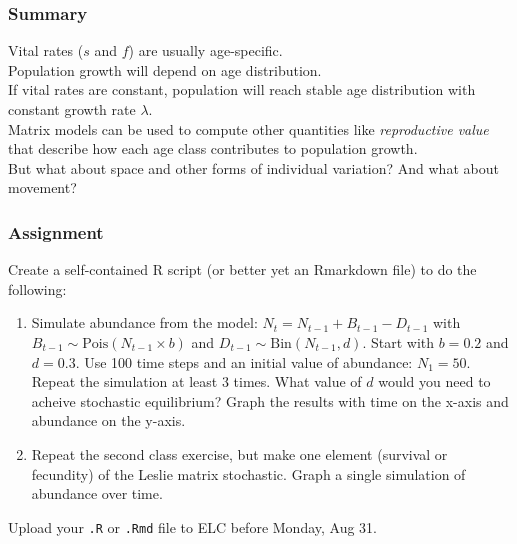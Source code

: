 \documentclass[color=usenames,dvipsnames]{beamer}\usepackage[]{graphicx}\usepackage[]{color}
\newcommand{\inr}[1]{\colorbox{inlinecolor}{\texttt{#1}}}
\begin{document}











\begin{frame}
  \frametitle{Summary}
  Vital rates ($s$ and $f$) are usually age-specific. \\
  \pause
  \vfill
  Population growth will depend on age distribution. \\
  \pause
  \vfill
  If vital rates are constant, population will reach stable
  age distribution with constant growth rate $\lambda$. \\
  \pause
  \vfill
  Matrix models can be used to compute other quantities like
  \emph{reproductive value} that describe how each age class
  contributes to population growth. \\
  \pause
  \vfill
  But what about space and other forms of individual variation? And
  what about movement?
\end{frame}



    

\begin{frame}
  \frametitle{Assignment}
  \small
  Create a self-contained R script (or better yet an Rmarkdown file)
  to do the following:
  \begin{enumerate}
    \small
    \item Simulate abundance from the model: $N_t = N_{t-1} + B_{t-1}
      - D_{t-1}$ with $B_{t-1} \sim \mathrm{Pois}(N_{t-1} \times b)$ and
      $D_{t-1} \sim \mathrm{Bin}(N_{t-1}, d)$. Start with $b=0.2$ and
      $d=0.3$. Use 100 time steps and an initial value of abundance:
      $N_1=50$. Repeat the simulation at least 3 times. What value of
      $d$ would you need to acheive stochastic equilibrium? Graph the
      results with time on the x-axis and abundance on the y-axis.
    \item Repeat the second class exercise, but make one element
      (survival or fecundity) of the Leslie matrix stochastic. Graph a
      single simulation of abundance over time.
  \end{enumerate}
  Upload your {\tt .R} or {\tt .Rmd} file to ELC before Monday, Aug 31. 
\end{frame}
\end{document}
